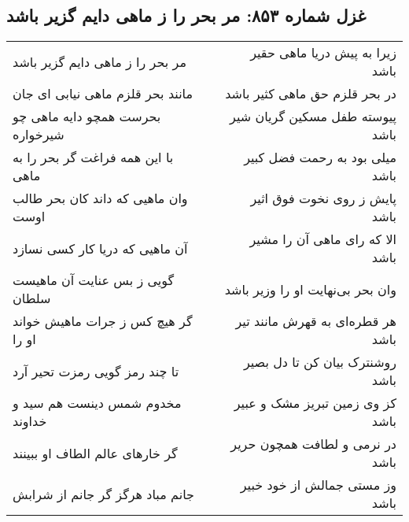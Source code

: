 \begin{center}
\section*{غزل شماره ۸۵۳: مر بحر را ز ماهی دایم گزیر باشد}
\label{sec:0853}
\begin{longtable}{l p{0.5cm} r}
مر بحر را ز ماهی دایم گزیر باشد
&&
زیرا به پیش دریا ماهی حقیر باشد
\\
مانند بحر قلزم ماهی نیابی ای جان
&&
در بحر قلزم حق ماهی کثیر باشد
\\
بحرست همچو دایه ماهی چو شیرخواره
&&
پیوسته طفل مسکین گریان شیر باشد
\\
با این همه فراغت گر بحر را به ماهی
&&
میلی بود به رحمت فضل کبیر باشد
\\
وان ماهیی که داند کان بحر طالب اوست
&&
پایش ز روی نخوت فوق اثیر باشد
\\
آن ماهیی که دریا کار کسی نسازد
&&
الا که رای ماهی آن را مشیر باشد
\\
گویی ز بس عنایت آن ماهیست سلطان
&&
وان بحر بی‌نهایت او را وزیر باشد
\\
گر هیچ کس ز جرات ماهیش خواند او را
&&
هر قطره‌ای به قهرش مانند تیر باشد
\\
تا چند رمز گویی رمزت تحیر آرد
&&
روشنترک بیان کن تا دل بصیر باشد
\\
مخدوم شمس دینست هم سید و خداوند
&&
کز وی زمین تبریز مشک و عبیر باشد
\\
گر خارهای عالم الطاف او ببینند
&&
در نرمی و لطافت همچون حریر باشد
\\
جانم مباد هرگز گر جانم از شرابش
&&
وز مستی جمالش از خود خبیر باشد
\\
\end{longtable}
\end{center}
